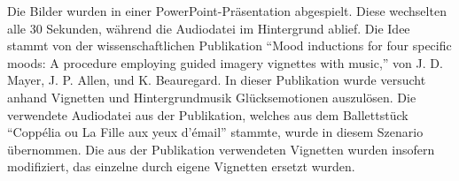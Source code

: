Die Bilder wurden in einer PowerPoint-Präsentation abgespielt. 
Diese wechselten alle 30 Sekunden, während die Audiodatei im Hintergrund ablief.
Die Idee stammt von der wissenschaftlichen Publikation ``Mood inductions for four specific moods: A procedure employing guided imagery vignettes with music,'' von J. D. Mayer, J. P. Allen, und K. Beauregard. 
In dieser Publikation wurde versucht anhand Vignetten und Hintergrundmusik Glücksemotionen auszulösen.
Die verwendete Audiodatei aus der Publikation, welches aus dem Ballettstück ``Coppélia ou La Fille aux yeux d'émail'' stammte, wurde in diesem Szenario übernommen. 
Die aus der Publikation verwendeten Vignetten wurden insofern modifiziert, das einzelne durch eigene Vignetten ersetzt wurden.


